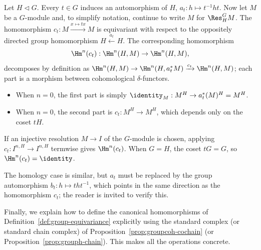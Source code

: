 \begin{example}[Conjugation]\label{eg:change-of-group-conj}
	Let $H\lhd G$. Every $t\in G$ induces an automorphism of $H$,
	$a_t:h\mapsto t^{-1}ht$. Now let $M$ be a $G$-module and, to simplify
	notation, continue to write $M$ for $\Res^G_HM$. The homomorphism
	$c_t:M\xrightarrow{x\mapsto tx}M$ is equivariant with respect to the
	oppositely directed group homomorphism $H\xleftarrow{a_t}H$. The
	corresponding homomorphism
	\[ \Hm^n(c_t): \Hm^n(H, M) \to \Hm^n(H, M), \]
	decomposes by definition as
	$\Hm^n(H,M)\to\Hm^n(H,a_t^*M)\xrightarrow{c_t}\Hm^n(H,M)$; each part is a
	morphism between cohomological $\delta$-functors.
	\begin{itemize}
		\item When $n=0$, the first part is simply
		$\identity_M:M^H\to a_t^*(M)^H=M^H$.
		\item When $n=0$, the second part is $c_t:M^H\to M^H$, which depends
		only on the coset $tH$.
	\end{itemize}
	If an injective resolution $M\to I$ of the $G$-module is chosen, applying
	$c_t:I^{n,H}\to I^{n,H}$ termwise gives $\Hm^n(c_t)$. When $G=H$, the
	coset $tG=G$, so $\Hm^n(c_t)=\identity$.

	The homology case is similar, but $a_t$ must be replaced by the group
	automorphism $b_t:h\mapsto tht^{-1}$, which points in the same direction
	as the homomorphism $c_t$; the reader is invited to verify this.
\end{example}

Finally, we explain how to define the canonical homomorphisms of
Definition~\ref{def:group-equivariance} explicitly using the standard complex
(or standard chain complex) of Proposition~\ref{prop:groupcoh-cochain} (or
Proposition~\ref{prop:grouph-chain}). This makes all the operations concrete.


